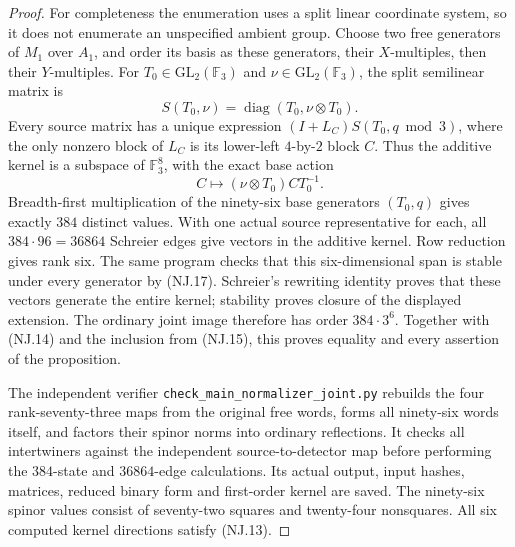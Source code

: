\begin{proof}
For completeness the enumeration uses a split linear coordinate
system, so it does not enumerate an unspecified ambient group.
Choose two free generators of \(M_1\) over \(A_1\), and order its
basis as these generators, their \(X\)-multiples, then their
\(Y\)-multiples. For \(T_0\in\mathrm{GL}_2(\mathbb F_3)\) and
\(\nu\in\mathrm{GL}_2(\mathbb F_3)\), the split semilinear matrix is
\[
 S(T_0,\nu)=\operatorname{diag}(T_0,\nu\otimes T_0).
 \tag{NJ.16}
\]
Every source matrix has a unique expression
\((I+L_C)S(T_0,q\bmod3)\), where the only nonzero block of
\(L_C\) is its lower-left \(4\)-by-\(2\) block \(C\).
Thus the additive kernel is a subspace of \(\mathbb F_3^8\),
with the exact base action
\[
 C\longmapsto(\nu\otimes T_0)C T_0^{-1}.
 \tag{NJ.17}
\]
Breadth-first multiplication of the ninety-six base generators
\((T_0,q)\) gives exactly \(384\) distinct values. With one actual
source representative for each, all \(384\cdot96=36864\) Schreier
edges give vectors in the additive kernel. Row reduction gives
rank six. The same program checks that this six-dimensional span
is stable under every generator by (NJ.17). Schreier's rewriting
identity proves that these vectors generate the entire kernel;
stability proves closure of the displayed extension. The ordinary
joint image therefore has order \(384\cdot3^6\).
Together with (NJ.14) and the inclusion from (NJ.15), this proves
equality and every assertion of the proposition.

The independent verifier
\texttt{check\_main\_normalizer\_joint.py} rebuilds the four
rank-seventy-three maps from the original free words, forms all
ninety-six words itself, and factors their spinor norms into ordinary
reflections. It checks all intertwiners against the independent
source-to-detector map before performing the \(384\)-state and
\(36864\)-edge calculations. Its actual output, input hashes,
matrices, reduced binary form and first-order kernel are saved.
The ninety-six spinor values consist of seventy-two squares and
twenty-four nonsquares. All six computed kernel directions satisfy
(NJ.13).
\end{proof}
